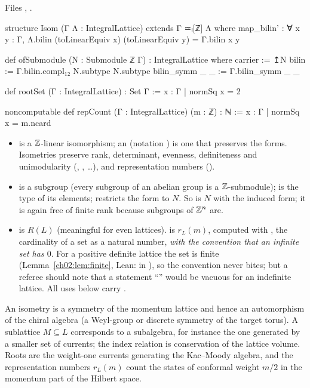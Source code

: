 \begin{definition}\label{ch02:def:ebemisc}
\end{definition}
\noindent Files , .
\begin{leancode}
structure Isom (Γ Λ : IntegralLattice) extends Γ ≃ₗ[ℤ] Λ where
  map_bilin' : ∀ x y : Γ, Λ.bilin (toLinearEquiv x) (toLinearEquiv y) = Γ.bilin x y

def ofSubmodule (N : Submodule ℤ Γ) : IntegralLattice where
  carrier := ↥N
  bilin := Γ.bilin.compl₁₂ N.subtype N.subtype
  bilin_symm _ _ := Γ.bilin_symm _ _

def rootSet (Γ : IntegralLattice) : Set Γ := {x : Γ | normSq x = 2}

noncomputable def repCount (Γ : IntegralLattice) (m : ℤ) : ℕ := {x : Γ | normSq x = m}.ncard
\end{leancode}
\begin{dictionary}
\begin{itemize}
\item {} is a ${\mathbb{Z}}$-linear isomorphism; an  (notation )
  is one that preserves the forms.  Isometries preserve rank, determinant, evenness,
  definiteness and unimodularity (, , \dots), and
  representation numbers ().
\item {} is a subgroup (every subgroup of an abelian group is a ${\mathbb{Z}}$-submodule);
   is the type of its elements;  restricts the form to
  $N$.  So  is $N$ with the induced form; it is again free of finite rank
  because subgroups of ${\mathbb{Z}}^n$ are.
\item {} is $R(L)$ (meaningful for even lattices).   is $r_L(m)$,
  computed with , the cardinality of a set as a natural number, \emph{with the
  convention that an infinite set has  $0$}.  For a positive definite lattice the set
  is finite (Lemma~\ref{ch02:lem:finite}, Lean:  in
  ), so the convention never bites; but a referee should note
  that a statement ``'' would be vacuous for an indefinite lattice.  All
  uses below carry .
\end{itemize}
\end{dictionary}
\begin{physics}
An isometry is a symmetry of the momentum lattice and hence an automorphism of the chiral algebra (a Weyl-group or discrete symmetry of the target torus). A sublattice $M\subseteq L$ corresponds to a subalgebra, for instance the one generated by a smaller set of currents; the index relation is conservation of the lattice volume. Roots are the weight-one currents generating the Kac--Moody algebra, and the representation numbers $r_L(m)$ count the states of conformal weight $m/2$ in the momentum part of the Hilbert space.
\end{physics}

